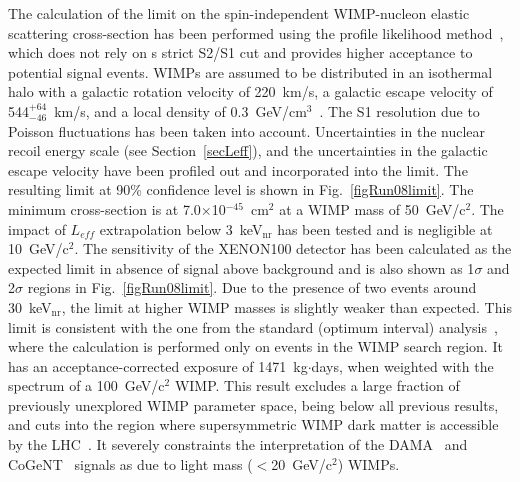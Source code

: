 The calculation of the limit on the spin-independent WIMP-nucleon elastic scattering cross-section has been performed using the profile likelihood method~\cite{ProfileLikelihood}, which does not rely on s strict S2/S1 cut and provides higher acceptance to potential signal events. WIMPs are assumed to be distributed in an isothermal halo with a galactic rotation velocity of 220~km/s, a galactic escape velocity of 544$^{+64}_{-46}$~km/s, and a local density of 0.3~GeV/cm$^{3}$~\cite{LewinSmith, Smith}. The S1 resolution due to Poisson fluctuations has been taken into account. Uncertainties in the nuclear recoil energy scale (see Section~\ref{secLeff}), and the uncertainties in the galactic escape velocity have been profiled out and incorporated into the limit. 
The resulting limit at 90\% confidence level is shown in Fig.~\ref{figRun08limit}. The minimum cross-section is at 7.0$\times$10$^{-45}$~cm$^{2}$ at a WIMP mass of 50~GeV/c$^{2}$. The impact of $L_{eff}$ extrapolation below 3~keV$_{\mathrm{nr}}$ has been tested and is negligible at 10~GeV/c$^{2}$. The sensitivity of the XENON100 detector has been calculated as the expected limit in absence of signal above background and is also shown as 1$\sigma$ and 2$\sigma$ regions in Fig.~\ref{figRun08limit}. Due to the presence of two events around 30~keV$_{\mathrm{nr}}$, the limit at higher WIMP masses is slightly weaker than expected. This limit is consistent with the one from the standard (optimum interval) analysis~\cite{Yellin}, where the calculation is performed only on events in the WIMP search region. It has an acceptance-corrected exposure of 1471~kg$\cdot$days, when weighted with the spectrum of a 100~GeV/c$^{2}$ WIMP. This result excludes a large fraction of previously unexplored WIMP parameter space, being below all previous results, and cuts into the region where supersymmetric WIMP dark matter is accessible by the LHC~\cite{LHC}. It  severely constraints the interpretation of the DAMA~\cite{DAMA_LightWIMP} and CoGeNT~\cite{CoGeNT_LightWIMP, CoGeNT_modulation} signals as due to light mass ($<$20~GeV/c$^{2}$) WIMPs.




